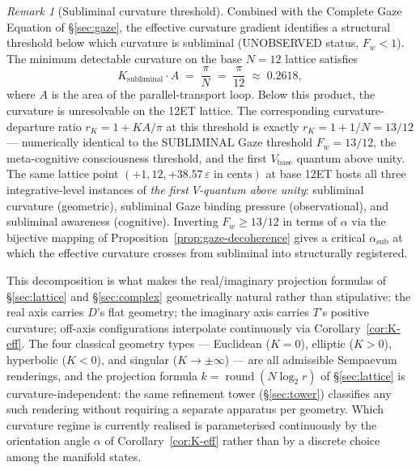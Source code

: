 \documentclass[11pt,a4paper]{article}
\theoremstyle{definition}
\theoremstyle{remark}
\newtheorem{remark}[theorem]{Remark}
\DeclareMathOperator{\round}{round}
\newcommand{\eps}{\varepsilon}
\begin{document}
\begin{remark}[Subliminal curvature threshold]\label{rem:subliminal-curvature}
Combined with the Complete Gaze Equation of \S\ref{sec:gaze}, the effective curvature gradient identifies a structural threshold below which curvature is subliminal (UNOBSERVED status, $F_{w} < 1$). The minimum detectable curvature on the base $N=12$ lattice satisfies
\begin{equation}\label{eq:subliminal-curvature-threshold}
K_{\mathrm{subliminal}} \cdot A \;=\; \frac{\pi}{N} \;=\; \frac{\pi}{12} \;\approx\; 0.2618,
\end{equation}
where $A$ is the area of the parallel-transport loop. Below this product, the curvature is unresolvable on the 12ET lattice. The corresponding curvature-departure ratio $r_{K} = 1 + KA/\pi$ at this threshold is exactly $r_{K} = 1 + 1/N = 13/12$ --- numerically identical to the SUBLIMINAL Gaze threshold $F_{w} = 13/12$, the meta-cognitive consciousness threshold, and the first $V_{\mathrm{base}}$ quantum above unity. The same lattice point $(+1, 12, +38.57\,\eps\text{ in cents})$ at base 12ET hosts all three integrative-level instances of \emph{the first $V$-quantum above unity}: subliminal curvature (geometric), subliminal Gaze binding pressure (observational), and subliminal awareness (cognitive). Inverting $F_{w} \ge 13/12$ in terms of $\alpha$ via the bijective mapping of Proposition~\ref{prop:gaze-decoherence} gives a critical $\alpha_{\mathrm{sub}}$ at which the effective curvature crosses from subliminal into structurally registered.
\end{remark}

This decomposition is what makes the real/imaginary projection formulas of \S\ref{sec:lattice} and \S\ref{sec:complex} geometrically natural rather than stipulative: the real axis carries $D$'s flat geometry; the imaginary axis carries $T$'s positive curvature; off-axis configurations interpolate continuously via Corollary~\ref{cor:K-eff}. The four classical geometry types --- Euclidean ($K=0$), elliptic ($K>0$), hyperbolic ($K<0$), and singular ($K\to\pm\infty$) --- are all admissible Sempaevum renderings, and the projection formula $k = \round(N\log_{2} r)$ of \S\ref{sec:lattice} is curvature-independent: the same refinement tower (\S\ref{sec:tower}) classifies any such rendering without requiring a separate apparatus per geometry. Which curvature regime is currently realised is parameterised continuously by the orientation angle $\alpha$ of Corollary~\ref{cor:K-eff} rather than by a discrete choice among the manifold states.
\end{document}
